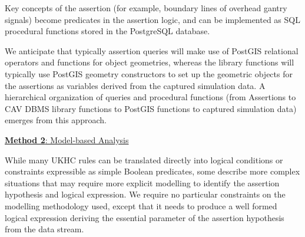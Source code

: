 
Key concepts of the assertion (for example, boundary lines of overhead gantry signals) become predicates in the assertion logic, and can be implemented as SQL procedural functions stored in the PostgreSQL database.%

We anticipate that typically assertion queries will make use of PostGIS relational operators and functions for object geometries, whereas the library functions will typically use PostGIS geometry constructors to set up the geometric objects for the assertions as variables derived from the captured simulation data. %
A hierarchical organization of queries and procedural functions (from Assertions to CAV DBMS library functions to PostGIS functions to captured simulation data) emerges from this approach.

\vspace{2mm}
\noindent\underline{\textbf{Method 2}: Model-based Analysis}
\label{model_based_analysis}

While many UKHC rules can be translated directly into logical conditions or constraints expressible as simple Boolean predicates, some describe more complex situations that may require more explicit modelling to identify the assertion hypothesis and logical expression. We require no particular constraints on the modelling methodology used, except that it needs to produce a well formed logical expression deriving the essential parameter of the assertion hypothesis from the data stream.

